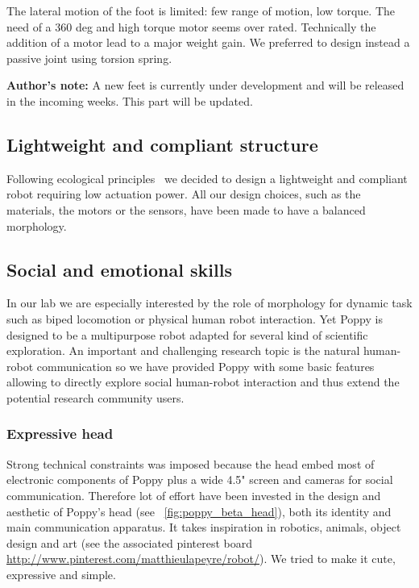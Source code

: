 The lateral motion of the foot is limited: few range of motion, low torque. The need of a 360 deg and high torque motor seems over rated. Technically the addition of a motor lead to a major weight gain. We preferred to design  instead a passive joint using torsion spring.

\textbf{Author's note:} A new feet is currently under development and will be released in the incoming weeks. This part will be updated.

\subsection{Lightweight and compliant structure} %
Following ecological principles~\cite{pfeifer2005new} we decided to design a lightweight and compliant robot requiring low actuation power. All our design choices, such as the materials, the motors or the sensors, have been made to have a balanced morphology.




\subsection{Social and emotional skills} %

In our lab we are especially interested by the role of morphology for dynamic task such as biped locomotion or physical human robot interaction. Yet Poppy is designed to be a multipurpose robot adapted for several kind of scientific exploration.
An important and challenging research topic is the natural human-robot communication so we have provided Poppy with some basic features allowing to directly explore social human-robot interaction and thus extend the potential research community users.

\subsubsection{Expressive head} %
Strong technical constraints was imposed because the head embed most of electronic components of Poppy plus a wide 4.5" screen and cameras for social communication. Therefore lot of effort have been invested in the design and aesthetic of Poppy's head (see \figurename~\ref{fig:poppy_beta_head}), both its identity and main communication apparatus. It takes inspiration in robotics, animals, object design and art (see the associated pinterest board \url{http://www.pinterest.com/matthieulapeyre/robot/}). We tried to make it cute, expressive and simple.

